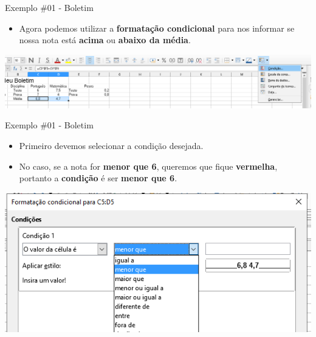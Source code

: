 \begin{frame}{Exemplo \#01 - Boletim}
	\begin{block}{}
		\begin{itemize}
			\item Agora podemos utilizar a \textbf{formatação condicional} para nos informar se nossa nota está \textbf{acima} ou \textbf{abaixo da média}.
		\end{itemize}
	\end{block}
	
	\bigskip
	
	\centering
	\includegraphics[width=1\linewidth]{Figuras/Ch06/fig44.6}
\end{frame}


\begin{frame}{Exemplo \#01 - Boletim}
	\begin{block}{}
		\begin{itemize}
			\item Primeiro devemos selecionar a condição desejada.
			\item No caso, se a nota for \textbf{menor que 6}, queremos que fique \textbf{vermelha}, portanto a \textbf{condição} é ser \textbf{menor que 6}.
		\end{itemize}
	\end{block}
	
	\bigskip
	
	\centering
	\includegraphics[width=0.8\linewidth]{Figuras/Ch06/fig44.7}
\end{frame}


